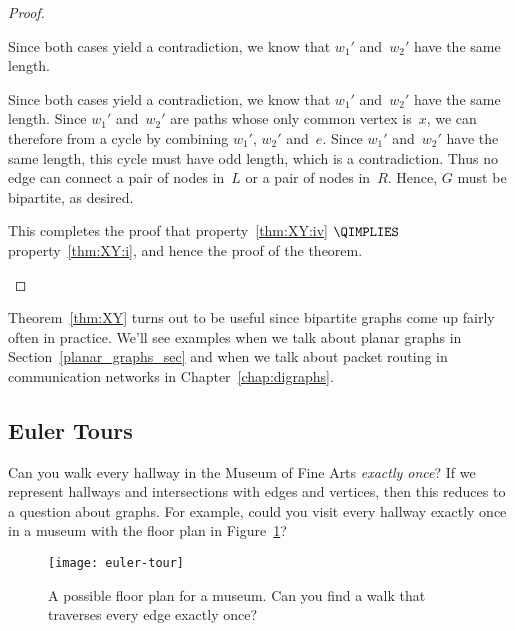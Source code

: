 \begin{editingnotes}
\begin{proof}
\begin{description}
\begin{description}
\end{description}

Since both cases yield a contradiction, we know that $w_1'$ and~$w_2'$
have the same length.

Since both cases yield a contradiction, we know that $w_1'$ and~$w_2'$
have the same length.  Since $w_1'$ and~$w_2'$ are paths whose only
common vertex is~$x$, we can therefore from a cycle by combining
$w_1'$, $w_2'$ and~$e$.  Since $w_1'$ and~$w_2'$ have the same length,
this cycle must have odd length, which is a contradiction.  Thus no
edge can connect a pair of nodes in~$L$ or a pair of nodes in~$R$.
Hence, $G$ must be bipartite, as desired.

This completes the proof that property~\ref{thm:XY:iv} $\QIMPLIES$
property~\ref{thm:XY:i}, and hence the proof of the theorem.  \qedhere

\end{description}

\end{proof}

Theorem~\ref{thm:XY} turns out to be useful since bipartite graphs
come up fairly often in practice.  We'll see examples when we talk
about planar graphs in Section~\ref{planar_graphs_sec} and when we
talk about packet routing in communication networks in
Chapter~\ref{chap:digraphs}.

\end{editingnotes}

\subsection{Euler Tours}

Can you walk every hallway in the Museum of Fine Arts \emph{exactly
  once}?  If we represent hallways and intersections with edges and
vertices, then this reduces to a question about graphs.  For example,
could you visit every hallway exactly once in a museum with the
floor plan in Figure~\ref{fig:5BC}?

\begin{figure}\redrawn


\texttt{[image: euler-tour]}

\caption{A possible floor plan for a museum. Can you find a walk that
  traverses every edge exactly once?}

\label{fig:5BC}

\end{figure}

